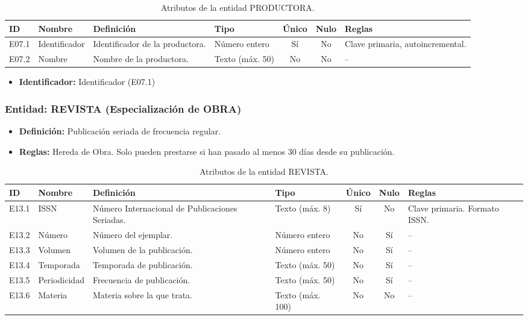 \begin{table}[H]
	\centering
	\caption{Atributos de la entidad PRODUCTORA.}
	\label{tab:dict_productora}
	\small
	\begin{tabularx}{\textwidth}{l l X l c c X}
		\toprule
		\textbf{ID} & \textbf{Nombre} & \textbf{Definición} & \textbf{Tipo} & \textbf{Único} & \textbf{Nulo} & \textbf{Reglas} \\
		\midrule
		E07.1 & Identificador & Identificador de la productora. & Número entero & Sí & No & Clave primaria, autoincremental. \\
		\addlinespace
		E07.2 & Nombre & Nombre de la productora. & Texto (máx. 50) & No & No & -- \\
		\bottomrule
	\end{tabularx}
\end{table}

\begin{itemize}
	\item\textbf{Identificador:} Identificador (E07.1)
\end{itemize}

\subsubsection{Entidad: REVISTA (Especialización de OBRA)}
\begin{itemize}
	\item\textbf{Definición:} Publicación seriada de frecuencia regular.
	\item\textbf{Reglas:} Hereda de Obra. Solo pueden prestarse si han pasado al menos 30 días desde su publicación.
\end{itemize}

\begin{table}[H]
	\centering
	\caption{Atributos de la entidad REVISTA.}
	\label{tab:dict_revista}
	\small
	\begin{tabularx}{\textwidth}{l l X l c c X}
		\toprule
		\textbf{ID} & \textbf{Nombre} & \textbf{Definición} & \textbf{Tipo} & \textbf{Único} & \textbf{Nulo} & \textbf{Reglas} \\
		\midrule
		E13.1 & ISSN & Número Internacional de Publicaciones Seriadas. & Texto (máx. 8) & Sí & No & Clave primaria. Formato ISSN. \\
		\addlinespace
		E13.2 & Número & Número del ejemplar. & Número entero & No & Sí & -- \\
		\addlinespace
		E13.3 & Volumen & Volumen de la publicación. & Número entero & No & Sí & -- \\
		\addlinespace
		E13.4 & Temporada & Temporada de publicación. & Texto (máx. 50) & No & Sí & -- \\
		\addlinespace
		E13.5 & Periodicidad & Frecuencia de publicación. & Texto (máx. 50) & No & Sí & -- \\
		\addlinespace
		E13.6 & Materia & Materia sobre la que trata. & Texto (máx. 100) & No & No & -- \\
		\bottomrule
	\end{tabularx}
\end{table}

